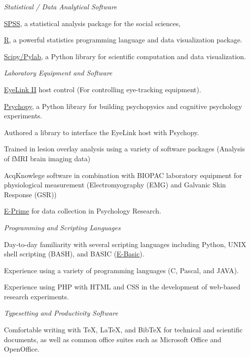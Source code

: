 \documentclass[10pt]{article}
\newenvironment{innerlist}[1][\enskip\textbullet]%
        {\begin{compactenum}[#1]}{\end{compactenum}}
\begin{document}
\begin{outerlist}
\item
  \emph{Statistical / Data Analytical Software}
 \begin{innerlist}
  \item
    \href{http://www.spss.com/}{SPSS}, a statistical analysis package
    for the social sciences,
  \item
    \href{http://www.r-project.org/}{R}, a powerful statistics
    programming language and data visualization package.
  \item
    \href{http://www.scipy.org/}{Scipy/Pylab}, a Python library for
    scientific computation and data visualization.
 \end{innerlist}
\item
  \emph{Laboratory Equipment and Software}
 \begin{innerlist}
  \item
    \href{www.sr-research.com}{EyeLink II} host control (For controlling
    eye-tracking equipment).
  \item
    \href{http://www.psychopy.org/}{Psychopy}, a Python library for
    building psychopysics and cognitive psychology experiments.
  \item
    Authored a library to interface the EyeLink host with Psychopy.
  \item
    Trained in lesion overlay analysis using a variety of software
    packages (Analysis of fMRI brain imaging data)
  \item
    AcqKnowlege software in combination with BIOPAC laboratory equipment
    for physiological measurement (Electromyography (EMG) and Galvanic
    Skin Response (GSR))
  \item
    \href{http://www.pstnet.com/products/e-prime/}{E-Prime} for data
    collection in Psychology Research.
 \end{innerlist}
\item
  \emph{Programming and Scripting Languages}
 \begin{innerlist}
  \item
    Day-to-day familiarity with several scripting languages including
    Python, UNIX shell scripting (BASH), and BASIC
    (\href{http://www.pstnet.com/products/e-prime/}{E-Basic}).
  \item
    Experience using a variety of programming languages (C, Pascal, and
    JAVA).
  \item
    Experience using PHP with HTML and CSS in the development of
    web-based research experiments.
 \end{innerlist}
\item
  \emph{Typesetting and Productivity Software}
 \begin{innerlist}
  \item
    Comfortable writing with TeX, LaTeX, and BibTeX for technical and
    scientific documents, as well as common office suites such as
    Microsoft Office and OpenOffice.
 \end{innerlist}
\end{outerlist}
\end{document}
